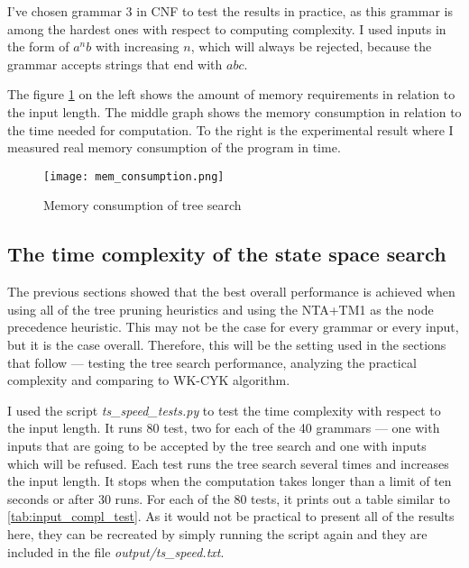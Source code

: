 I've chosen grammar 3 in CNF to test the results in practice, as this grammar is among the hardest ones with respect to computing complexity. I used inputs in the form of $a^nb$ with increasing $n$, which will always be rejected, because the grammar accepts strings that end with $abc$.

The figure \ref{fig:mem_consumption} on the left shows the amount of memory requirements in relation to the input length. The middle graph shows the memory consumption in relation to the time needed for computation. To the right is the experimental result where I measured real memory consumption of the program in time.

\begin{figure}[h!]
  \texttt{[image: mem\_consumption.png]}
  \caption{Memory consumption of tree search}
  \label{fig:mem_consumption}
\end{figure}


\subsection{The time complexity of the state space search}
The previous sections showed that the best overall performance is achieved when using all of the tree pruning heuristics and using the NTA+TM1 as the node precedence heuristic. This may not be the case for every grammar or every input, but it is the case overall. Therefore, this will be the setting used in the sections that follow --- testing the tree search performance, analyzing the practical complexity and comparing to WK-CYK algorithm.

I used the script \textit{ts\_speed\_tests.py} to test the time complexity with respect to the input length. It runs 80 test, two for each of the 40 grammars --- one with inputs that are going to be accepted by the tree search and one with inputs which will be refused. Each test runs the tree search several times and increases the input length. It stops when the computation takes longer than a limit of ten seconds or after 30 runs. For each of the 80 tests, it prints out a table similar to \ref{tab:input_compl_test}. As it would not be practical to present all of the results here, they can be recreated by simply running the script again and they are included in the file \textit{output/ts\_speed.txt}.

